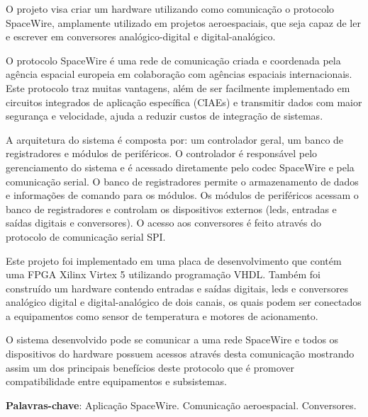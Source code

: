 \documentclass[
	12pt,				%
	openright,			%
	twoside,			%
	a4paper,			%
	english,			%
	french,				%
	spanish,			%
	brazil				%
	]{abntex2}
\begin{document}
\begin{resumo} 
	O projeto visa criar um hardware utilizando como comunicação o protocolo SpaceWire, amplamente utilizado em projetos aeroespaciais, que seja capaz de ler e escrever em conversores analógico-digital e digital-analógico.
	
	O protocolo SpaceWire é uma rede de comunicação criada e coordenada pela agência espacial europeia em colaboração com agências espaciais internacionais. Este protocolo traz muitas vantagens, além de ser facilmente implementado em circuitos integrados de aplicação específica (CIAEs) e transmitir dados com maior segurança e velocidade, ajuda a reduzir custos de integração de sistemas.
	
	A arquitetura do sistema é composta por: um controlador geral, um banco de registradores e módulos de periféricos. O controlador é responsável pelo gerenciamento do sistema e é acessado diretamente pelo codec SpaceWire e pela comunicação serial. O banco de registradores permite o armazenamento de dados e informações de comando para os módulos. Os módulos de periféricos acessam o banco de registradores e controlam os dispositivos externos (leds, entradas e saídas digitais e conversores). O acesso aos conversores é feito através do protocolo de comunicação serial SPI.
	
	Este projeto foi implementado em uma placa de desenvolvimento que contém uma FPGA Xilinx Virtex 5 utilizando programação VHDL. Também foi construído um hardware contendo entradas e saídas digitais, leds e conversores analógico digital e digital-analógico de dois canais, os quais podem ser conectados a equipamentos como sensor de temperatura e motores de acionamento.
	
	O sistema desenvolvido pode se comunicar a uma rede SpaceWire e todos os dispositivos do hardware possuem acessos através desta comunicação mostrando assim um dos principais benefícios deste protocolo que é promover compatibilidade entre equipamentos e subsistemas.


 \textbf{Palavras-chave}: Aplicação SpaceWire. Comunicação aeroespacial. Conversores.
\end{resumo}
\end{document}
